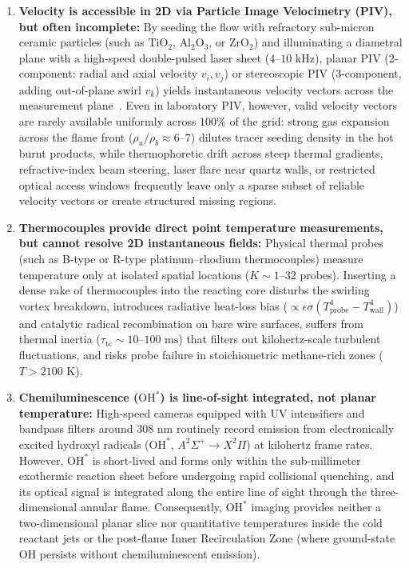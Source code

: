 \begin{enumerate}
    \item \textbf{Velocity is accessible in 2D via Particle Image Velocimetry (PIV), but often incomplete:} By seeding the flow with refractory sub-micron ceramic particles (such as $\text{TiO}_2$, $\text{Al}_2\text{O}_3$, or $\text{ZrO}_2$) and illuminating a diametral plane with a high-speed double-pulsed laser sheet ($4\text{--}10\text{ kHz}$), planar PIV (2-component: radial and axial velocity $v_i, v_j$) or stereoscopic PIV (3-component, adding out-of-plane swirl $v_k$) yields instantaneous velocity vectors across the measurement plane~\cite{raffel2018particle}. Even in laboratory PIV, however, valid velocity vectors are rarely available uniformly across $100\%$ of the grid: strong gas expansion across the flame front ($\rho_u/\rho_b \approx 6\text{--}7$) dilutes tracer seeding density in the hot burnt products, while thermophoretic drift across steep thermal gradients, refractive-index beam steering, laser flare near quartz walls, or restricted optical access windows frequently leave only a sparse subset of reliable velocity vectors or create structured missing regions.
    \item \textbf{Thermocouples provide direct point temperature measurements, but cannot resolve 2D instantaneous fields:} Physical thermal probes (such as B-type or R-type platinum--rhodium thermocouples) measure temperature only at isolated spatial locations ($K \sim 1\text{--}32$ probes). Inserting a dense rake of thermocouples into the reacting core disturbs the swirling vortex breakdown, introduces radiative heat-loss bias ($\propto \epsilon\sigma(T_{\text{probe}}^4 - T_{\text{wall}}^4)$) and catalytic radical recombination on bare wire surfaces, suffers from thermal inertia ($\tau_{\text{tc}} \sim 10\text{--}100\text{ ms}$) that filters out kilohertz-scale turbulent fluctuations, and risks probe failure in stoichiometric methane-rich zones ($T > 2100\text{ K}$).
    \item \textbf{Chemiluminescence ($\text{OH}^*$) is line-of-sight integrated, not planar temperature:} High-speed cameras equipped with UV intensifiers and bandpass filters around $308\text{ nm}$ routinely record emission from electronically excited hydroxyl radicals ($\text{OH}^*$, $A^2\Sigma^+ \rightarrow X^2\Pi$) at kilohertz frame rates. However, $\text{OH}^*$ is short-lived and forms only within the sub-millimeter exothermic reaction sheet before undergoing rapid collisional quenching, and its optical signal is integrated along the entire line of sight through the three-dimensional annular flame. Consequently, $\text{OH}^*$ imaging provides neither a two-dimensional planar slice nor quantitative temperatures inside the cold reactant jets or the post-flame Inner Recirculation Zone (where ground-state $\text{OH}$ persists without chemiluminescent emission).

\end{enumerate}
